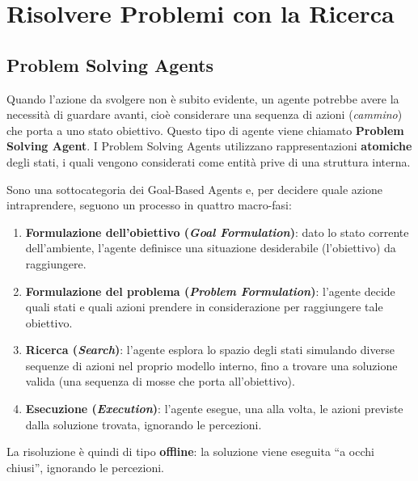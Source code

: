 \documentclass[a4paper, 11pt, oneside]{book}
\theoremstyle{definition}
\begin{document}
\begin{figure}[H]
{
		}
	\end{figure}

	\chapter{Risolvere Problemi con la Ricerca}

	\section{Problem Solving Agents}
	Quando l'azione da svolgere non \`e subito evidente, un agente potrebbe avere
	la necessit\`a di guardare avanti, cio\`e considerare una sequenza di azioni
	(\emph{cammino}) che porta a uno stato obiettivo. Questo tipo di agente viene
	chiamato \textbf{Problem Solving Agent}. I Problem Solving Agents utilizzano rappresentazioni \textbf{atomiche} degli stati, i quali vengono
	considerati come entit\`a prive di una struttura interna.

	Sono una sottocategoria dei Goal-Based Agents e, per decidere quale azione
	intraprendere, seguono un processo in quattro macro-fasi:
	\begin{enumerate}
		\item \textbf{Formulazione dell'obiettivo (\emph{Goal Formulation})}: dato lo
			stato corrente dell'ambiente, l'agente definisce una situazione
			desiderabile (l'obiettivo) da raggiungere.

		\item \textbf{Formulazione del problema (\emph{Problem Formulation})}: l'agente
			decide quali stati e quali azioni prendere in considerazione per
			raggiungere tale obiettivo.

		\item \textbf{Ricerca (\emph{Search})}: l'agente esplora lo spazio degli stati
			simulando diverse sequenze di azioni nel proprio modello interno, fino a
			trovare una soluzione valida (una sequenza di mosse che porta all'obiettivo).

		\item \textbf{Esecuzione (\emph{Execution})}: l'agente esegue, una alla
			volta, le azioni previste dalla soluzione trovata, ignorando le percezioni.
	\end{enumerate}
	La risoluzione \`e quindi di tipo \textbf{offline}: la soluzione viene eseguita
	``a occhi chiusi'', ignorando le percezioni.
\end{document}
